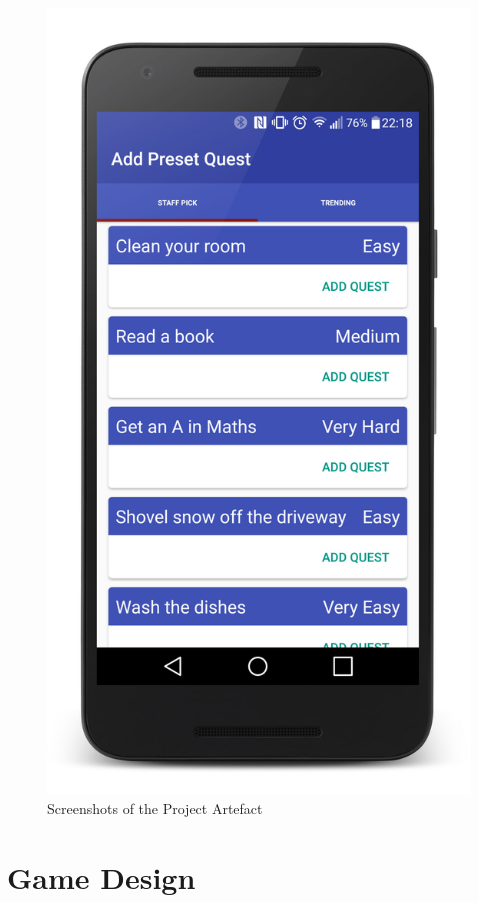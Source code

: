 \begin{figure}[ht]
\begin{minipage}[b]{0.25\linewidth}
    \includegraphics[width=1\linewidth]{../images/Screenshot/AddPresetQuestScreen.jpg}
    \vspace{2ex}
  \end{minipage} 
  \caption{Screenshots of the Project Artefact}
  \label{fig:screenshots}
\end{figure}

\section{Game Design}
